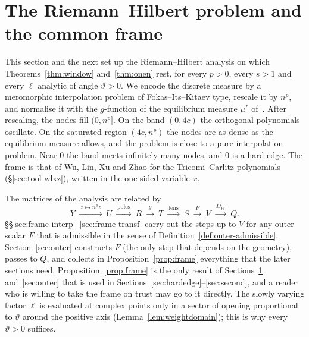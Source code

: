
\section{The Riemann--Hilbert problem and the common frame}\label{sec:frame}

This section and the next set up the Riemann--Hilbert analysis on which Theorems~\ref{thm:window} and~\ref{thm:onen}
rest, for every $p>0$, every $s>1$ and every $\ell$ analytic of angle $\vartheta>0$. We encode the discrete measure by a
meromorphic interpolation problem of Fokas--Its--Kitaev type, rescale it by $n^p$, and normalise it with the
$g$-function of the equilibrium measure $\mu^*$ of~\cite{Paper1}. After rescaling, the nodes fill $(0,n^p]$. On the band
$(0,4c)$ the orthogonal polynomials oscillate. On the saturated region $(4c,n^p)$ the nodes are as dense as the
equilibrium measure allows, and the problem is close to a pure interpolation problem. Near $0$ the band meets
infinitely many nodes, and $0$ is a hard edge. The frame is that of Wu, Lin, Xu and Zhao for the Tricomi--Carlitz polynomials
(\S\ref{sec:tool-wlxz}), written in the one-sided variable $x$.

The matrices of the analysis are related by
\[
  Y\ \xrightarrow{\ z\mapsto n^pz\ }\ U\ \xrightarrow{\ \text{poles}\ }\ R\ \xrightarrow{\ g\ }\ T\
  \xrightarrow{\ \text{lens}\ }\ S\ \xrightarrow{\ F\ }\ V\ \xrightarrow{\ D_W\ }\ Q .
\]
\S\S\ref{sec:frame-interp}--\ref{sec:frame-transf} carry out the steps up to $V$ for any outer scalar $F$ that is
admissible in the sense of Definition~\ref{def:outer-admissible}. Section~\ref{sec:outer} constructs $F$ (the only step
that depends on the geometry), passes to $Q$, and collects in Proposition~\ref{prop:frame} everything that the later
sections need. Proposition~\ref{prop:frame} is the only result of Sections~\ref{sec:frame} and~\ref{sec:outer} that is
used in Sections~\ref{sec:hardedge}--\ref{sec:second}, and a reader who is willing to take the frame on trust may go to
it directly. The slowly varying factor $\ell$ is evaluated at complex points only in a sector of opening proportional to
$\vartheta$ around the positive axis (Lemma~\ref{lem:weightdomain}); this is why every $\vartheta>0$ suffices.

